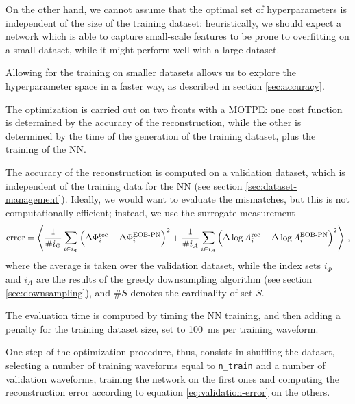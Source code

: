 \documentclass[main.tex]{subfiles}
\begin{document}
On the other hand, we cannot assume that the optimal set of hyperparameters is independent of the size of the training dataset: heuristically, we should expect a network which is able to capture small-scale features to be prone to overfitting on a small dataset, while it might perform well with a large dataset. 

Allowing for the training on smaller datasets allows us to explore the hyperparameter space in a faster way, as described in section \ref{sec:accuracy}.

The optimization is carried out on two fronts with a \ac{MOTPE}: one cost function is determined by the accuracy of the reconstruction, while the other is determined by the time of the generation of the training dataset, plus the training of the \ac{NN}. 

The accuracy of the reconstruction is computed on a validation dataset, which is independent of the training data for the \ac{NN} (see section \ref{sec:dataset-management}). 
Ideally, we would want to evaluate the mismatches, but this is not computationally efficient; instead, we use the surrogate measurement 
%
\begin{align} \label{eq:validation-error}
\text{error} =\expval{ \frac{1}{\# i_\Phi } \sum _{i \in i_\Phi } \qty(\Delta \Phi ^{\text{rec}}_i - \Delta \Phi ^{\text{EOB-PN}}_i )^2 + \frac{1}{\# i_A} \sum _{i \in i_A} \qty(\Delta \log A ^{\text{rec}}_i - \Delta \log A ^{\text{EOB-PN}}_i)^2}
\,,
\end{align}
%
where the average is taken over the validation dataset, while the index sets \(i_\Phi \) and \(i_A\) are the results of the greedy downsampling algorithm (see section \ref{sec:downsampling}), and \(\# S\) denotes the cardinality of set \(S\). 

The evaluation time is computed by timing the \ac{NN} training, and then adding a penalty for the training dataset size, set to \SI{100}{ms} per training waveform. 

One step of the optimization procedure, thus, consists in shuffling the dataset, selecting a number of training waveforms equal to  \texttt{n\_train} and a number of validation waveforms, training the network on the first ones and computing the reconstruction error according to equation \eqref{eq:validation-error} on the others.

\end{document}
